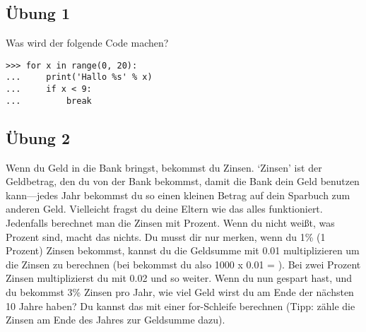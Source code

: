 \subsection*{Übung 1}
Was wird der folgende Code machen?

\begin{Verbatim}[frame=single]
>>> for x in range(0, 20):
...     print('Hallo %s' % x)
...     if x < 9:
...         break
\end{Verbatim}



\subsection*{Übung 2}
Wenn du Geld in die Bank bringst, bekommst du Zinsen. `Zinsen' ist der Geldbetrag, den du von der Bank bekommst, damit die Bank dein Geld benutzen kann---jedes Jahr bekommst du so einen kleinen Betrag auf dein Sparbuch zum anderen Geld. Vielleicht fragst du deine Eltern wie das alles funktioniert.
Jedenfalls berechnet man die Zinsen mit Prozent. Wenn du nicht weißt, was Prozent sind, macht das nichts. Du musst dir nur merken, wenn du 1\% (1 Prozent) Zinsen bekommst, kannst du die Geldsumme mit 0.01 multiplizieren um die Zinsen zu berechnen (bei  bekommst du also 1000 x 0.01 = ). Bei zwei Prozent Zinsen multiplizierst du mit 0.02 und so weiter.
Wenn du nun  gespart hast, und du bekommst 3\% Zinsen pro Jahr, wie viel Geld wirst du am Ende der nächsten 10 Jahre haben? Du kannst das mit einer for-Schleife berechnen (Tipp: zähle die Zinsen am Ende des Jahres zur Geldsumme dazu).
\newpage
